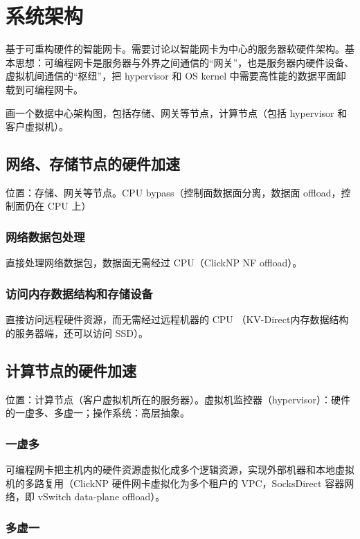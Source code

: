\chapter{系统架构}

基于可重构硬件的智能网卡。需要讨论以智能网卡为中心的服务器软硬件架构。基本思想：可编程网卡是服务器与外界之间通信的“网关”，也是服务器内硬件设备、虚拟机间通信的“枢纽”，把 hypervisor 和 OS kernel 中需要高性能的数据平面卸载到可编程网卡。

画一个数据中心架构图，包括存储、网关等节点，计算节点（包括 hypervisor 和客户虚拟机）。

\section{网络、存储节点的硬件加速}

位置：存储、网关等节点。CPU bypass（控制面数据面分离，数据面 offload，控制面仍在 CPU 上）

\subsection{网络数据包处理}

直接处理网络数据包，数据面无需经过 CPU（ClickNP NF offload）。

\subsection{访问内存数据结构和存储设备}

直接访问远程硬件资源，而无需经过远程机器的 CPU （KV-Direct内存数据结构的服务器端，还可以访问 SSD）。

\section{计算节点的硬件加速}

位置：计算节点（客户虚拟机所在的服务器）。虚拟机监控器（hypervisor）：硬件的一虚多、多虚一；操作系统：高层抽象。

\subsection{一虚多}

可编程网卡把主机内的硬件资源虚拟化成多个逻辑资源，实现外部机器和本地虚拟机的多路复用（ClickNP 硬件网卡虚拟化为多个租户的 VPC，SocksDirect 容器网络，即 vSwitch data-plane offload）。

\subsection{多虚一}

